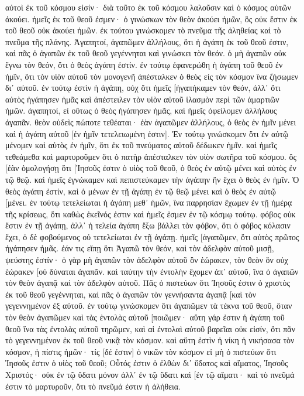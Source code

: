 αὐτοὶ ἐκ τοῦ κόσμου εἰσίν· διὰ τοῦτο ἐκ τοῦ κόσμου λαλοῦσιν καὶ ὁ κόσμος αὐτῶν ἀκούει. 
ἡμεῖς ἐκ τοῦ θεοῦ ἐσμεν· ὁ γινώσκων τὸν θεὸν ἀκούει ἡμῶν, ὃς οὐκ ἔστιν ἐκ τοῦ θεοῦ οὐκ ἀκούει ἡμῶν. ἐκ τούτου γινώσκομεν τὸ πνεῦμα τῆς ἀληθείας καὶ τὸ πνεῦμα τῆς πλάνης. 
Ἀγαπητοί, ἀγαπῶμεν ἀλλήλους, ὅτι ἡ ἀγάπη ἐκ τοῦ θεοῦ ἐστιν, καὶ πᾶς ὁ ἀγαπῶν ἐκ τοῦ θεοῦ γεγέννηται καὶ γινώσκει τὸν θεόν. 
ὁ μὴ ἀγαπῶν οὐκ ἔγνω τὸν θεόν, ὅτι ὁ θεὸς ἀγάπη ἐστίν. 
ἐν τούτῳ ἐφανερώθη ἡ ἀγάπη τοῦ θεοῦ ἐν ἡμῖν, ὅτι τὸν υἱὸν αὐτοῦ τὸν μονογενῆ ἀπέσταλκεν ὁ θεὸς εἰς τὸν κόσμον ἵνα ζήσωμεν δι᾽ αὐτοῦ. 
ἐν τούτῳ ἐστὶν ἡ ἀγάπη, οὐχ ὅτι ἡμεῖς [ἠγαπήκαμεν τὸν θεόν, ἀλλ᾽ ὅτι αὐτὸς ἠγάπησεν ἡμᾶς καὶ ἀπέστειλεν τὸν υἱὸν αὐτοῦ ἱλασμὸν περὶ τῶν ἁμαρτιῶν ἡμῶν. 
ἀγαπητοί, εἰ οὕτως ὁ θεὸς ἠγάπησεν ἡμᾶς, καὶ ἡμεῖς ὀφείλομεν ἀλλήλους ἀγαπᾶν. 
θεὸν οὐδεὶς πώποτε τεθέαται· ἐὰν ἀγαπῶμεν ἀλλήλους, ὁ θεὸς ἐν ἡμῖν μένει καὶ ἡ ἀγάπη αὐτοῦ [ἐν ἡμῖν τετελειωμένη ἐστιν]. 
Ἐν τούτῳ γινώσκομεν ὅτι ἐν αὐτῷ μένομεν καὶ αὐτὸς ἐν ἡμῖν, ὅτι ἐκ τοῦ πνεύματος αὐτοῦ δέδωκεν ἡμῖν. 
καὶ ἡμεῖς τεθεάμεθα καὶ μαρτυροῦμεν ὅτι ὁ πατὴρ ἀπέσταλκεν τὸν υἱὸν σωτῆρα τοῦ κόσμου. 
ὃς [ἐὰν ὁμολογήσῃ ὅτι [Ἰησοῦς ἐστιν ὁ υἱὸς τοῦ θεοῦ, ὁ θεὸς ἐν αὐτῷ μένει καὶ αὐτὸς ἐν τῷ θεῷ. 
καὶ ἡμεῖς ἐγνώκαμεν καὶ πεπιστεύκαμεν τὴν ἀγάπην ἣν ἔχει ὁ θεὸς ἐν ἡμῖν. Ὁ θεὸς ἀγάπη ἐστίν, καὶ ὁ μένων ἐν τῇ ἀγάπῃ ἐν τῷ θεῷ μένει καὶ ὁ θεὸς ἐν αὐτῷ [μένει. 
ἐν τούτῳ τετελείωται ἡ ἀγάπη μεθ᾽ ἡμῶν, ἵνα παρρησίαν ἔχωμεν ἐν τῇ ἡμέρᾳ τῆς κρίσεως, ὅτι καθὼς ἐκεῖνός ἐστιν καὶ ἡμεῖς ἐσμεν ἐν τῷ κόσμῳ τούτῳ. 
φόβος οὐκ ἔστιν ἐν τῇ ἀγάπῃ, ἀλλ᾽ ἡ τελεία ἀγάπη ἔξω βάλλει τὸν φόβον, ὅτι ὁ φόβος κόλασιν ἔχει, ὁ δὲ φοβούμενος οὐ τετελείωται ἐν τῇ ἀγάπῃ. 
ἡμεῖς [ἀγαπῶμεν, ὅτι αὐτὸς πρῶτος ἠγάπησεν ἡμᾶς. 
ἐάν τις εἴπῃ ὅτι Ἀγαπῶ τὸν θεόν, καὶ τὸν ἀδελφὸν αὐτοῦ μισῇ, ψεύστης ἐστίν· ὁ γὰρ μὴ ἀγαπῶν τὸν ἀδελφὸν αὐτοῦ ὃν ἑώρακεν, τὸν θεὸν ὃν οὐχ ἑώρακεν [οὐ δύναται ἀγαπᾶν. 
καὶ ταύτην τὴν ἐντολὴν ἔχομεν ἀπ᾽ αὐτοῦ, ἵνα ὁ ἀγαπῶν τὸν θεὸν ἀγαπᾷ καὶ τὸν ἀδελφὸν αὐτοῦ. 
Πᾶς ὁ πιστεύων ὅτι Ἰησοῦς ἐστιν ὁ χριστὸς ἐκ τοῦ θεοῦ γεγέννηται, καὶ πᾶς ὁ ἀγαπῶν τὸν γεννήσαντα ἀγαπᾷ [καὶ τὸν γεγεννημένον ἐξ αὐτοῦ. 
ἐν τούτῳ γινώσκομεν ὅτι ἀγαπῶμεν τὰ τέκνα τοῦ θεοῦ, ὅταν τὸν θεὸν ἀγαπῶμεν καὶ τὰς ἐντολὰς αὐτοῦ [ποιῶμεν· 
αὕτη γάρ ἐστιν ἡ ἀγάπη τοῦ θεοῦ ἵνα τὰς ἐντολὰς αὐτοῦ τηρῶμεν, καὶ αἱ ἐντολαὶ αὐτοῦ βαρεῖαι οὐκ εἰσίν, 
ὅτι πᾶν τὸ γεγεννημένον ἐκ τοῦ θεοῦ νικᾷ τὸν κόσμον. καὶ αὕτη ἐστὶν ἡ νίκη ἡ νικήσασα τὸν κόσμον, ἡ πίστις ἡμῶν· 
τίς [δέ ἐστιν] ὁ νικῶν τὸν κόσμον εἰ μὴ ὁ πιστεύων ὅτι Ἰησοῦς ἐστιν ὁ υἱὸς τοῦ θεοῦ; 
Οὗτός ἐστιν ὁ ἐλθὼν δι᾽ ὕδατος καὶ αἵματος, Ἰησοῦς Χριστός· οὐκ ἐν τῷ ὕδατι μόνον ἀλλ᾽ ἐν τῷ ὕδατι καὶ [ἐν τῷ αἵματι· καὶ τὸ πνεῦμά ἐστιν τὸ μαρτυροῦν, ὅτι τὸ πνεῦμά ἐστιν ἡ ἀλήθεια. 
